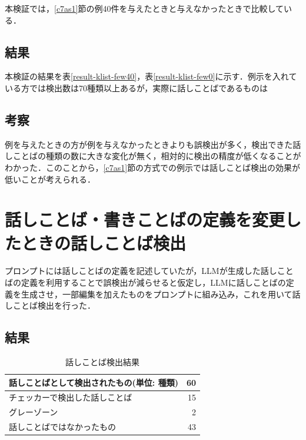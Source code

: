 本検証では，\ref{c7as1}節の例40件を与えたときと与えなかったときで比較している．

\subsection{結果}
本検証の結果を表\ref{result-klist-few40}，表\ref{result-klist-few0}に示す．例示を入れている方では検出数は70種類以上あるが，実際に話しことばであるものは



\subsection{考察}
例を与えたときの方が例を与えなかったときよりも誤検出が多く，検出できた話しことばの種類の数に大きな変化が無く，相対的に検出の精度が低くなることがわかった．このことから，\ref{c7as1}節の方式での例示では話しことば検出の効果が低いことが考えられる．

\section{話しことば・書きことばの定義を変更したときの話しことば検出}
プロンプトには話しことばの定義を記述していたが，LLMが生成した話しことばの定義を利用することで誤検出が減らせると仮定し，LLMに話しことばの定義を生成させ，一部編集を加えたものをプロンプトに組み込み，これを用いて話しことば検出を行った．



\subsection{結果}

\begin{table}[H]
\centering
\caption{話しことば検出結果}
\label{result-checker-detect}
\begin{tabular}{|l|r|}
\hline
話しことばとして検出されたもの(単位: 種類) & 60 \\ \hline
チェッカーで検出した話しことば & 15 \\ \hline
グレーゾーン & 2 \\ \hline
話しことばではなかったもの & 43 \\ \hline
\end{tabular}
\end{table} %

